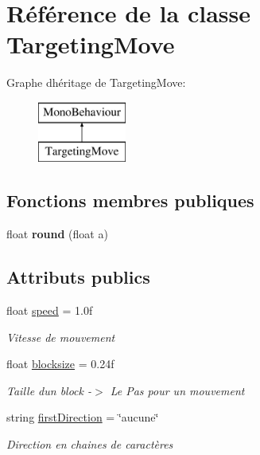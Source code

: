 \hypertarget{class_targeting_move}{}\section{Référence de la classe Targeting\+Move}
\label{class_targeting_move}
Graphe d\textquotesingle{}héritage de Targeting\+Move\+:\begin{figure}[H]
\begin{center}
\leavevmode
\includegraphics[height=2.000000cm]{class_targeting_move}
\end{center}
\end{figure}
\subsection*{Fonctions membres publiques}
\begin{DoxyCompactItemize}
\item 
\mbox{\label{class_targeting_move_a65a4d699d9637b9a3aa4fcd7ee8ea4be}} 
float {\bfseries round} (float a)
\end{DoxyCompactItemize}
\subsection*{Attributs publics}
\begin{DoxyCompactItemize}
\item 
float \hyperlink{class_targeting_move_a18c74fa8724c7faec50dae67ad7b527d}{speed} = 1.\+0f
\begin{DoxyCompactList}\small\item\em Vitesse de mouvement \end{DoxyCompactList}\item 
float \hyperlink{class_targeting_move_ae3c99569094a8163b09a9b9f3607e2c1}{blocksize} = 0.\+24f
\begin{DoxyCompactList}\small\item\em Taille d\textquotesingle{}un block -\/$>$ Le Pas pour un mouvement \end{DoxyCompactList}\item 
string \hyperlink{class_targeting_move_a3f08aa20c9b9db6b215d8b83113c888d}{first\+Direction} = \char`\"{}aucune\char`\"{}
\begin{DoxyCompactList}\small\item\em Direction en chaines de caractères \end{DoxyCompactList}\end{DoxyCompactItemize}
